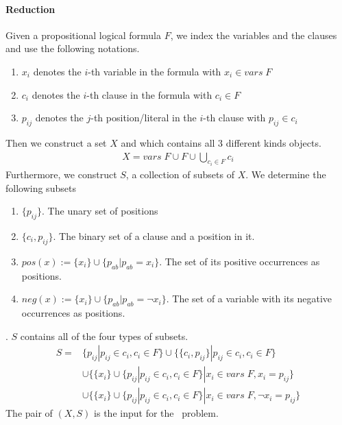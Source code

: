 \paragraph{Reduction}
Given a propositional logical formula $F$, we index the variables and the clauses and use the following notations.
\begin{enumerate}
    \item $x_i$ denotes the $i$-th variable in the formula with $x_i \in vars\; F$
    \item $c_i$ denotes the $i$-th clause in the formula with $c_i \in F$
    \item $p_{ij}$ denotes the $j$-th position/literal in the $i$-th clause with $p_{ij} \in c_i$
\end{enumerate} 
Then we construct a set $X$ and which contains all 3 different kinds objects. 
\begin{align*}
    X = vars\; F \cup F \cup \bigcup_{c_i \in F} c_i
\end{align*}
Furthermore, we construct $S$, a collection of subsets of $X$. We determine the following subsets
\begin{enumerate}
    \item $\{p_{ij}\}$. The unary set of positions
    \item $\{c_i, p_{ij}\}$. The binary set of a clause and a position in it.
    \item $pos(x) := \{x_i\} \cup \{p_{ab} | p_{ab} = x_i\}$. The set of its positive occurrences as positions.
    \item $neg(x):= \{x_i\} \cup \{p_{ab} | p_{ab} = \neg x_i\}$. The set of a variable with  its negative occurrences as positions.
\end{enumerate}.
$S$ contains all of the four types of subsets.
\begin{align*}
    S =& \{{p_{ij}} | p_{ij} \in c_i, c_i \in F \} 
    \cup \{\{c_i, p_{ij}\} | p_{ij} \in c_i, c_i \in F \} \\
    &\cup \{\{x_i\} \cup \{p_{ij} | p_{ij} \in c_i, c_i \in F\} | x_i \in vars\; F, x_i = p_{ij}\}\\
    &\cup \{\{x_i\} \cup \{p_{ij} | p_{ij} \in c_i, c_i \in F\} | x_i \in vars\; F, \neg x_i = p_{ij}\}
\end{align*}
The pair of $(X, S)$ is the input for the \XC\ problem. 

